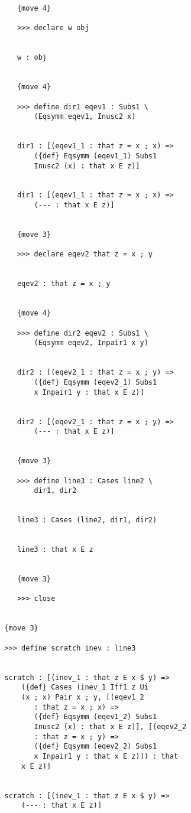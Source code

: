\documentclass[12pt]{article}
\begin{document}
\begin{verbatim}
            {move 4}

            >>> declare w obj


            w : obj


            {move 4}

            >>> define dir1 eqev1 : Subs1 \
                (Eqsymm eqev1, Inusc2 x)


            dir1 : [(eqev1_1 : that z = x ; x) => 
                ({def} Eqsymm (eqev1_1) Subs1 
                Inusc2 (x) : that x E z)]


            dir1 : [(eqev1_1 : that z = x ; x) => 
                (--- : that x E z)]


            {move 3}

            >>> declare eqev2 that z = x ; y


            eqev2 : that z = x ; y


            {move 4}

            >>> define dir2 eqev2 : Subs1 \
                (Eqsymm eqev2, Inpair1 x y)


            dir2 : [(eqev2_1 : that z = x ; y) => 
                ({def} Eqsymm (eqev2_1) Subs1 
                x Inpair1 y : that x E z)]


            dir2 : [(eqev2_1 : that z = x ; y) => 
                (--- : that x E z)]


            {move 3}

            >>> define line3 : Cases line2 \
                dir1, dir2


            line3 : Cases (line2, dir1, dir2)


            line3 : that x E z


            {move 3}

            >>> close


         {move 3}

         >>> define scratch inev : line3


         scratch : [(inev_1 : that z E x $ y) => 
             ({def} Cases (inev_1 Iff1 z Ui 
             (x ; x) Pair x ; y, [(eqev1_2 
                : that z = x ; x) => 
                ({def} Eqsymm (eqev1_2) Subs1 
                Inusc2 (x) : that x E z)], [(eqev2_2 
                : that z = x ; y) => 
                ({def} Eqsymm (eqev2_2) Subs1 
                x Inpair1 y : that x E z)]) : that 
             x E z)]


         scratch : [(inev_1 : that z E x $ y) => 
             (--- : that x E z)]



\end{verbatim}
\end{document}
